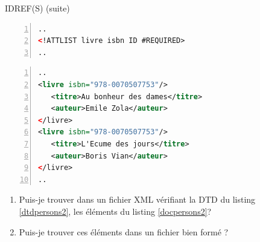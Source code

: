 \begin{frame}[containsverbatim]{IDREF(S) (suite)}
\begin{minipage}{0.7\textwidth}

\vspace{-0.5cm}
\begin{lstlisting}[basicstyle=\footnotesize, language=XML,breaklines=true,numbers=left, label={dtdpersons2}, caption={Bout de déclaration dans une DTD}]
..
<!ATTLIST livre isbn ID #REQUIRED>
..
\end{lstlisting}
\end{minipage}

\vspace{-0.7cm}

\begin{flushright}
\begin{minipage}{0.5\textwidth}
\begin{lstlisting}[basicstyle=\footnotesize, language=XML,breaklines=true,numbers=left, label={docpersons2}, caption={Bout d'instance}]
..
<livre isbn="978-0070507753"/>
   <titre>Au bonheur des dames</titre>
   <auteur>Emile Zola</auteur>
</livre>
<livre isbn="978-0070507753"/>
   <titre>L'Ecume des jours</titre>
   <auteur>Boris Vian</auteur>
</livre>
..
\end{lstlisting}
\end{minipage}
\end{flushright}
 
\vspace{-0.5cm}
\begin{exoblock}
\begin{enumerate}
\item Puis-je trouver dans un fichier XML vérifiant la DTD du listing \ref{dtdpersons2}, les éléments du listing \ref{docpersons2}?
\item Puis-je trouver ces éléments dans un fichier bien formé ? 
\end{enumerate}
\end{exoblock}

\end{frame}


